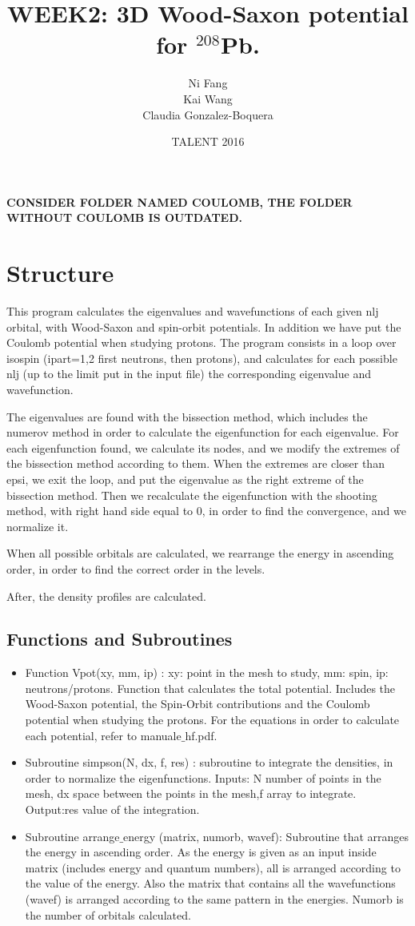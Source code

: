 \documentclass[a4paper,10pt]{article}
\title{WEEK2: 3D Wood-Saxon potential for $^{208}$Pb.}
\author{Ni Fang\\ Kai Wang\\Claudia Gonzalez-Boquera}
\date{TALENT 2016}
\begin{document}
\maketitle
\textbf{CONSIDER FOLDER NAMED COULOMB, THE FOLDER WITHOUT COULOMB IS OUTDATED.}
\section{Structure}

This program calculates the eigenvalues and wavefunctions of each given nlj orbital, 
with Wood-Saxon and spin-orbit potentials. In addition we have put the Coulomb potential 
when studying protons.
The program consists in a loop over isospin (ipart=1,2 first neutrons, then protons), 
and calculates for each possible nlj (up to the limit put in the input file) the 
corresponding eigenvalue and wavefunction.

The eigenvalues are found with the bissection method, which includes the numerov 
method in order to calculate the eigenfunction for each eigenvalue. For each
eigenfunction found, we calculate its nodes, and we modify the extremes of the 
bissection method according to them. When the extremes are closer than epsi,
we exit the loop, and put the eigenvalue as the right extreme of the bissection
method. 
Then we recalculate the eigenfunction with the shooting method, with 
right hand side equal to 0, in order to find the convergence, and we normalize it. 

When all possible orbitals are calculated, we rearrange the energy in ascending order, 
in order to find the correct order in the levels. 

After, the density profiles are calculated.
\subsection{Functions and Subroutines}
\begin{itemize}
 \item Function Vpot(xy, mm, ip) :  xy: point in the mesh to study, mm: spin, ip: neutrons/protons.
 Function that calculates the total potential. 
 Includes the Wood-Saxon potential, the Spin-Orbit contributions and the Coulomb potential
 when studying the protons. For the equations in order to calculate each potential, refer to manuale$\_$hf.pdf. 

 \item Subroutine simpson(N, dx, f, res) : subroutine to integrate the densities, in order to normalize the 
eigenfunctions. Inputs: N number of points in the mesh, dx space between the points in the mesh,f array
to integrate. Output:res  value of the integration. 
\item Subroutine arrange$\_$energy (matrix, numorb, wavef): Subroutine that arranges the energy in 
ascending order. As the energy is given as an input inside matrix (includes energy and quantum numbers), 
all is arranged according to the value of the energy. Also the matrix that contains all the wavefunctions 
(wavef) is arranged according to the same pattern in the energies. Numorb is the number of orbitals calculated.

\end{itemize}
\end{document}
